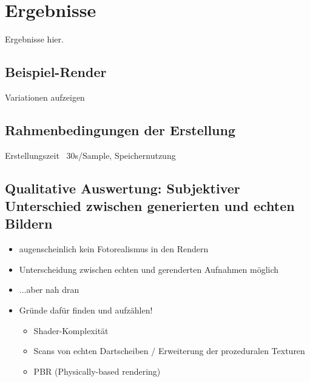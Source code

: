 
\section{Ergebnisse}
\label{sec:daten:ergebnisse}

Ergebnisse hier.

\subsection{Beispiel-Render}  %
\label{sec:render_beispiel}

Variationen aufzeigen

\todo{}


\subsection{Rahmenbedingungen der Erstellung}  %
\label{sec:render_info}

Erstellungszeit ~30s/Sample, Speichernutzung

\todo{}

\subsection{Qualitative Auswertung: Subjektiver Unterschied zwischen generierten und echten Bildern}  %
\label{sec:rendering_qualitativ}

\begin{itemize}
    \item augenscheinlich kein Fotorealismus in den Rendern
    \item Unterscheidung zwischen echten und gerenderten Aufnahmen möglich
    \item ...aber nah dran
    \item Gründe dafür finden und aufzählen!
          \begin{itemize}
              \item Shader-Komplexität
              \item Scans von echten Dartscheiben / Erweiterung der prozeduralen Texturen
              \item PBR (Physically-based rendering)
          \end{itemize}
\end{itemize}

\todo{}


